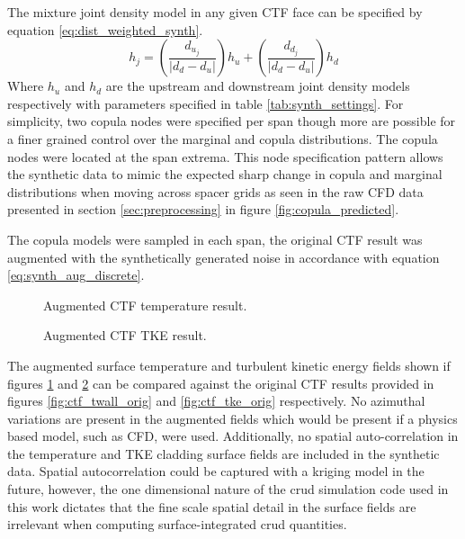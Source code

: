 The mixture joint density model in any given CTF face can be specified by equation \ref{eq:dist_weighted_synth}.
\begin{equation}
    h_j = \left( \frac{d_{u_j}}{|d_{d} - d_{u}|} \right) h_u +
    \left( \frac{d_{d_j}}{|d_{d} - d_{u}|} \right) h_d
    \label{eq:dist_weighted_synth}
\end{equation}
Where $h_u$ and $h_d$ are the upstream and downstream joint density models respectively with parameters specified in table \ref{tab:synth_settings}.
For simplicity, two copula nodes were specified per span though more are possible for a finer grained control over the marginal and copula distributions.    The copula nodes were located at the span extrema. This node specification pattern allows the synthetic data to mimic the expected sharp change in copula and marginal distributions when moving across spacer grids as seen in the raw CFD data presented in section \ref{sec:preprocessing} in figure \ref{fig:copula_predicted}.

The copula models were sampled in each span, the original CTF result was augmented with the synthetically generated noise in accordance with equation \ref{eq:synth_aug_discrete}.

\begin{figure}[H]%
    \centering
    \qquad
    \caption[Augmented CFD result.]{Augmented CTF temperature result.}%
    \label{fig:ctf_twall_aug}%
\end{figure}

\begin{figure}[H]%
    \centering
    \qquad
    \caption[Augmented CFD TKE result.]{Augmented CTF TKE result.}%
    \label{fig:ctf_tke_aug}%
\end{figure}

The augmented surface temperature and turbulent kinetic energy fields shown if figures \ref{fig:ctf_twall_aug} and \ref{fig:ctf_tke_aug} can be compared against the original CTF results provided in figures \ref{fig:ctf_twall_orig} and \ref{fig:ctf_tke_orig} respectively.  No azimuthal variations are present in the augmented fields which would be present if a physics based model, such as CFD, were used.  Additionally, no spatial auto-correlation in the temperature and TKE cladding surface fields are included in the synthetic data.  Spatial autocorrelation could be captured with a kriging model in the future, however, the one dimensional nature of the crud simulation code used in this work dictates that the fine scale spatial detail in the surface fields are irrelevant when computing surface-integrated crud quantities.


